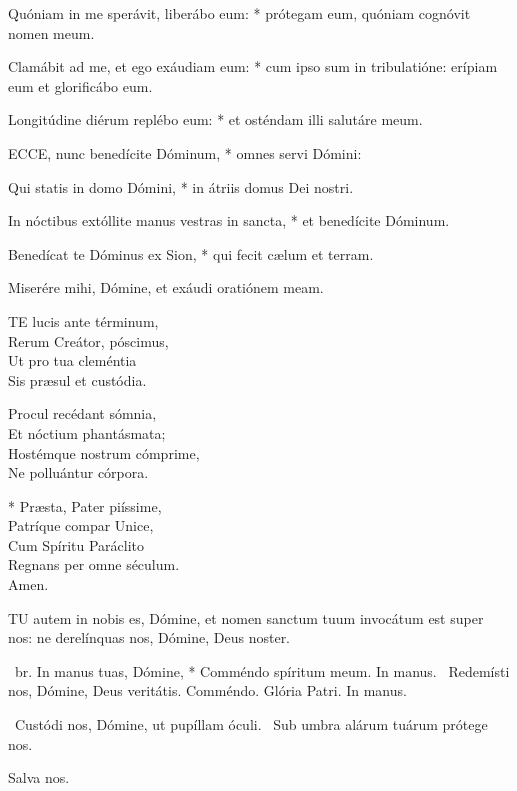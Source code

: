 Quóniam in me sperávit, liberábo eum: * prótegam eum, quóniam cognóvit nomen meum.

Clamábit ad me, et ego exáudiam eum: * cum ipso sum in tribulatióne: erípiam eum et glorificábo eum.

Longitúdine diérum replébo eum: * et osténdam illi salutáre meum.


\lettrine[lines=2]{E}{CCE}, nunc benedícite Dóminum, * omnes servi Dómini:

Qui statis in domo Dómini, * in átriis domus Dei nostri.

In nóctibus extóllite manus vestras in sancta, * et benedícite Dóminum.

Benedícat te Dóminus ex Sion, * qui fecit cælum et terram.

 Miserére mihi, Dómine, et exáudi oratiónem meam.


\lettrine[lines=2]{T}{E} lucis ante términum,\\
Rerum Creátor, póscimus,\\
Ut pro tua cleméntia\\
Sis præsul et custódia.

Procul recédant sómnia,\\
Et nóctium phantásmata;\\
Hostémque nostrum cómprime,\\
Ne polluántur córpora.

* Præsta, Pater piíssime,\\
Patríque compar Unice,\\
Cum Spíritu Paráclito\\
Regnans per omne séculum.\\
Amen.


\lettrine[lines=2]{T}{U} autem in nobis es, Dómine, et nomen sanctum tuum invocátum est super nos: ne derelínquas nos, Dómine, Deus noster.

\R\ br. In manus tuas, Dómine, * Comméndo spíritum meum. In manus. \V\ Redemísti nos, Dómine, Deus veritátis. Comméndo. Glória Patri. In manus.

\V\ Custódi nos, Dómine, ut pupíllam óculi. \R\ Sub umbra alárum tuárum prótege nos.

 Salva nos.


